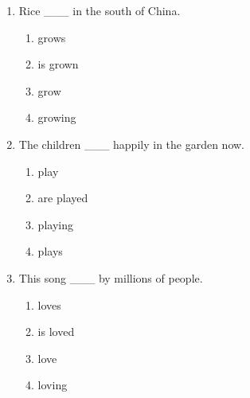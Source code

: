 \documentclass[11pt,a4paper]{ctexart}
\begin{document}
\begin{enumerate}[leftmargin=*,itemsep=4pt]
\begin{enumerate}[label=\Alph*.,leftmargin=2em,itemsep=1pt,topsep=2pt]
\item break
\item breaking
\end{enumerate}
\item Rice \_\_\_ in the south of China.
\begin{enumerate}[label=\Alph*.,leftmargin=2em,itemsep=1pt,topsep=2pt]
\item grows
\item is grown
\item grow
\item growing
\end{enumerate}
\item The children \_\_\_ happily in the garden now.
\begin{enumerate}[label=\Alph*.,leftmargin=2em,itemsep=1pt,topsep=2pt]
\item play
\item are played
\item playing
\item plays
\end{enumerate}
\item This song \_\_\_ by millions of people.
\begin{enumerate}[label=\Alph*.,leftmargin=2em,itemsep=1pt,topsep=2pt]
\item loves
\item is loved
\item love
\item loving
\end{enumerate}
\end{enumerate}
\end{document}
